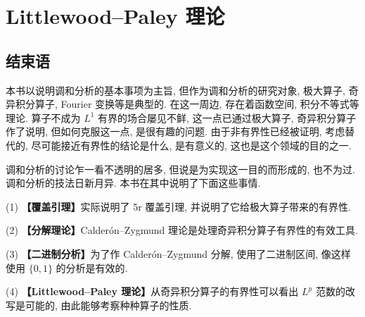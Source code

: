 \chapter{Littlewood--Paley 理论}



\section*{结束语}

本书以说明调和分析的基本事项为主旨, 但作为调和分析的研究对象, 极大算子, 奇异积分算子, Fourier 变换等是典型的. 在这一周边, 存在着函数空间, 积分不等式等理论. 算子不成为 $L^{1}$ 有界的场合屡见不鲜, 这一点已通过极大算子, 奇异积分算子作了说明, 但如何克服这一点, 是很有趣的问题. 由于非有界性已经被证明, 考虑替代的, 尽可能接近有界性的结论是什么, 是有意义的, 这也是这个领域的目的之一.

调和分析的讨论乍一看不透明的居多, 但说是为实现这一目的而形成的, 也不为过. 调和分析的技法日新月异. 本书在其中说明了下面这些事情.

(1) \textbf{【覆盖引理】}实际说明了 5r 覆盖引理, 并说明了它给极大算子带来的有界性.

(2) \textbf{【分解理论】}Calderón--Zygmund 理论是处理奇异积分算子有界性的有效工具.

(3) \textbf{【二进制分析】}为了作 Calderón--Zygmund 分解, 使用了二进制区间, 像这样使用 $\{0,1\}$ 的分析是有效的.

(4) \textbf{【Littlewood--Paley 理论】}从奇异积分算子的有界性可以看出 $L^{p}$ 范数的改写是可能的, 由此能够考察种种算子的性质.
